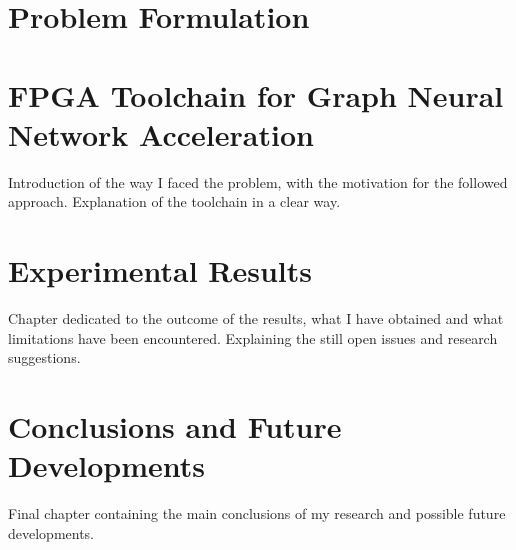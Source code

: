 \documentclass{Configuration_Files/PoliMi3i_thesis}
\begin{document}


    \chapter{Problem Formulation}
    \label{ch:chapter_four}%
    



    \chapter{FPGA Toolchain for Graph Neural Network Acceleration}
    \label{ch:chapter_five}%

    Introduction of the way I faced the problem, with the motivation for the followed approach.
    Explanation of the toolchain in a clear way.



    \chapter{Experimental Results}
    \label{ch:chapter_six}%

    Chapter dedicated to the outcome of the results, what I have obtained and what limitations have been encountered.
    Explaining the still open issues and research suggestions.




    \chapter{Conclusions and Future Developments}
    \label{ch:conclusions}%
    Final chapter containing the main conclusions of my research
    and possible future developments.
\end{document}
